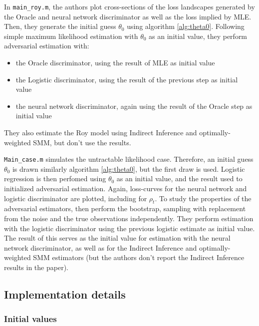 In \texttt{main\_roy.m}, the authors plot cross-sections of the loss landscapes generated by the Oracle and neural network discriminator as well as the loss implied by MLE. %
Then, they generate the initial guess $\theta_0$ using algorithm \ref{alg:theta0}.
Following simple maximum likelihood estimation with $\theta_0$ as an initial value, they perform adversarial estimation with:
\begin{itemize}
    \item the Oracle discriminator, using the result of MLE as initial value
    \item the Logistic discriminator, using the result of the previous step as initial value
    \item the neural network discriminator, again using the result of the Oracle step as initial value
\end{itemize} 
They also estimate the Roy model using Indirect Inference and optimally-weighted SMM, but don't use the results.

\texttt{Main\_case.m} simulates the untractable likelihood case.
Therefore, an initial guess $\theta_0$ is drawn similarly algorithm \ref{alg:theta0}, but the first draw is used.
Logistic regression is then perfomed using $\theta_0$ as an initial value, and the result used to initialized adversarial estimation. %
Again, loss-curves for the neural network and logistic discriminator are plotted, including for $\rho_t$.
To study the properties of the adversarial estimators, \textcite{kaji2023adversarial} then perform the bootstrap, sampling with replacement from the noise and the true observations independently.
They perform estimation with the logistic discriminator using the previous logistic estimate as initial value.
The result of this serves as the initial value for estimation with the neural network discriminator, as well as for the Indirect Inference and optimally-weighted SMM estimators (but the authors don't report the Indirect Inference results in the paper). %


\subsection{Implementation details}
\label{sec:Implementation}

\subsubsection{Initial values}
\label{sec:initial_values}


